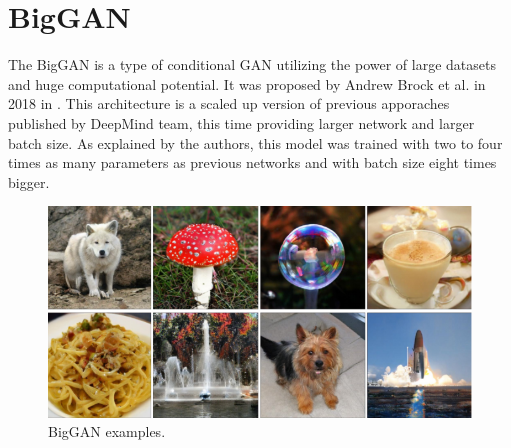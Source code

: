 \documentclass[12pt,a4paper,openany]{book}
\begin{document}





\section{BigGAN}

\noindent The BigGAN is a type of conditional GAN utilizing the power of large datasets and huge computational potential. It was proposed by Andrew Brock et al. in 2018 in \cite{biggan}. This architecture is a scaled up version of previous apporaches published by DeepMind team, this time providing larger network and larger batch size. As explained by the authors, this model was trained with two to four times as many parameters as previous networks and with batch size eight times bigger. 

\begin{figure}[H]
    \centering
    \includegraphics[scale=0.7]{figs/biggan_sample.png}
    \caption{BigGAN examples.}\label{Fig:biggan_sample}
\end{figure}
\end{document}
